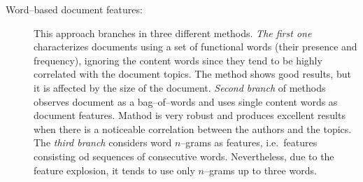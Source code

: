 \documentclass[11pt,english]{article}
\newcommand{\engl}[1]{(engl.~\emph{#1})}
\begin{document}
\begin{multicols}{2}
\begin{description}
\item[Word--based document features:] This approach branches in three different
methods. \emph{The first one} characterizes documents using a set of functional
words (their presence and frequency), ignoring the content words since they tend
to be highly correlated with the document topics. The method shows good results,
but it is affected by the size of the document. \emph{Second branch} of methods
observes document as a bag--of--words and uses single content words as document
features. Mathod is very robust and produces excellent results when there is a
noticeable correlation between the authors and the topics. The \emph{third
branch} considers word $n$--grams as features, i.e.\ features consisting od
sequences of consecutive words. Nevertheless, due to the feature explosion, it
tends to use only $n$--grams up to three words.
\end{description}


\end{multicols}
\end{document}
